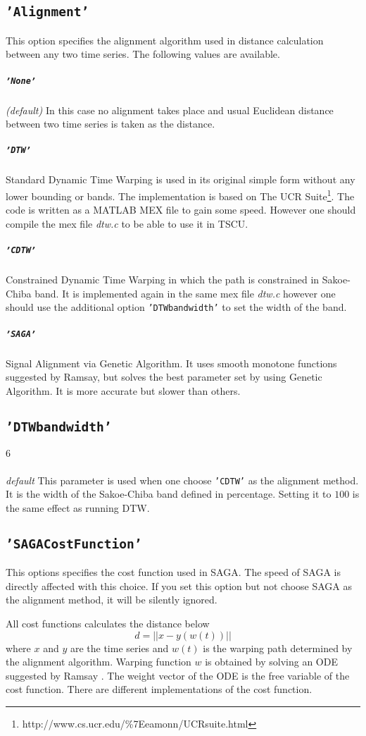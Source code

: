 \documentclass{article}
\begin{document}
\subsection{\texttt{'Alignment'}} 
This option specifies the alignment algorithm used in distance calculation between any two time series. The following values are available.

\subparagraph*{\texttt{'None'}} {\it (default)} In this case no alignment takes place and usual Euclidean distance between two time series is taken as the distance.

\subparagraph*{\texttt{'DTW'}} Standard Dynamic Time Warping is used in its original simple form without any lower bounding or bands. The implementation is based on The UCR Suite\footnote{http://www.cs.ucr.edu/\%7Eeamonn/UCRsuite.html}. The code is written as a MATLAB MEX file to gain some speed. However one should compile the mex file {\it dtw.c} to be able to use it in TSCU. 

\subparagraph*{\texttt{'CDTW'}} Constrained Dynamic Time Warping in which the path is constrained in Sakoe-Chiba band. It is implemented again in the same mex file {\it dtw.c} however one should use the additional option \texttt{'DTWbandwidth'} to set the width of the band.

\subparagraph*{\texttt{'SAGA'}} Signal Alignment via Genetic Algorithm. It uses smooth monotone functions suggested by Ramsay\cite{Ramsay1998}, but solves the best parameter set by using Genetic Algorithm\cite{Kaya2013113}. It is more accurate but slower than others.


 
\subsection{\texttt{'DTWbandwidth'}} 
\subparagraph*{$6$} {\it default} This parameter is used when one choose \texttt{'CDTW'} as the alignment method. It is the width of the Sakoe-Chiba band defined in percentage. Setting it to $100$ is the same effect as running DTW.

\subsection{\texttt{'SAGACostFunction'}} 
This options specifies the cost function used in SAGA. The speed of SAGA is directly affected with this choice. If you set this option but not choose SAGA as the alignment method, it will be silently ignored.

All cost functions calculates the distance below 
$$ d = || x - y(w(t)) ||$$
where $x$ and $y$ are the time series and $w(t)$ is the warping path determined by the alignment algorithm. Warping function $w$ is obtained by solving an ODE suggested by Ramsay \cite{Ramsay1998}. The weight vector of the ODE is the free variable of the cost function. There are different implementations of the cost function.
\end{document}
